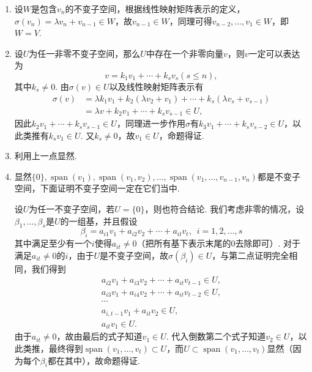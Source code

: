 \documentclass[UTF8,12pt,a4paper,fontset=fandol]{ctexart}
\begin{document}
\begin{solve}
\begin{enumerate}
        \item 设$W$是包含$v_n$的不变子空间，根据线性映射矩阵表示的定义，$\sigma(v_n)=\lambda v_n+v_{n-1}\in W$，故$v_{n-1}\in W$，同理可得$v_{n-2},\ldots,v_1\in W$，即$W=V$.

        \item 设$U$为任一非零不变子空间，那么$U$中存在一个非零向量$v$，则$v$一定可以表达为
              \[v=k_1v_1+\cdots+k_sv_s(s\leqslant n),\]
              其中$k_s\neq 0$. 由$\sigma(v)\in U$以及线性映射矩阵表示有
              \begin{align*}
                  \sigma(v) & = \lambda k_1v_1+k_2(\lambda v_2+v_1)+\cdots+k_s(\lambda v_s+v_{s-1}) \\
                            & = \lambda v+k_2v_1+\cdots+k_sv_{s-1}\in U,
              \end{align*}
              因此$k_2v_1+\cdots+k_sv_{s-1}\in U$，同理进一步作用$\sigma$有$k_3v_1+\cdots+k_sv_{s-2}\in U$，以此类推有$k_sv_1\in U$. 又$k_s\neq 0$，故$v_1\in U$，命题得证.

        \item 利用上一点显然.

        \item 显然$\{0\},\operatorname{span}(v_1),\operatorname{span}(v_1,v_2),\ldots,\operatorname{span}(v_1,\ldots,v_{n-1},v_n)$都是不变子空间，下面证明不变子空间一定在它们当中.

              设$U$为任一不变子空间，若$U=\{0\}$，则也符合结论. 我们考虑非零的情况，设$\beta_1,\ldots,\beta_s$是$U$的一组基，并且假设
              \[\beta_i=a_{i1}v_1+a_{i2}v_2+\cdots+a_{it}v_t,\enspace i=1,2,\ldots,s\]
              其中满足至少有一个$i$使得$a_{it}\neq 0$（把所有基下表示末尾的0去除即可）. 对于满足$a_{it}\neq 0$的$i$，由于$U$是不变子空间，故$\sigma(\beta_i)\in U$，与第二点证明完全相同，我们得到
              \begin{align*}
                  a_{i2}v_1+a_{i3}v_2+\cdots+a_{it}v_{t-1}\in U, \\
                  a_{i3}v_1+a_{i4}v_2+\cdots+a_{it}v_{t-2}\in U, \\
                  \cdots                                         \\
                  a_{i,t-1}v_1+a_{it}v_2\in U,                   \\
                  a_{it}v_1\in U.
              \end{align*}
              由于$a_{it}\neq 0$，故由最后的式子知道$v_1\in U$. 代入倒数第二个式子知道$v_2\in U$，以此类推，最终得到$\operatorname{span}(v_1,\ldots,v_t)\subset U$，而$U\subset\operatorname{span}(v_1,\ldots,v_t)$显然（因为每个$\beta_i$都在其中），故命题得证.
    \end{enumerate}
\end{solve}
\end{document}
